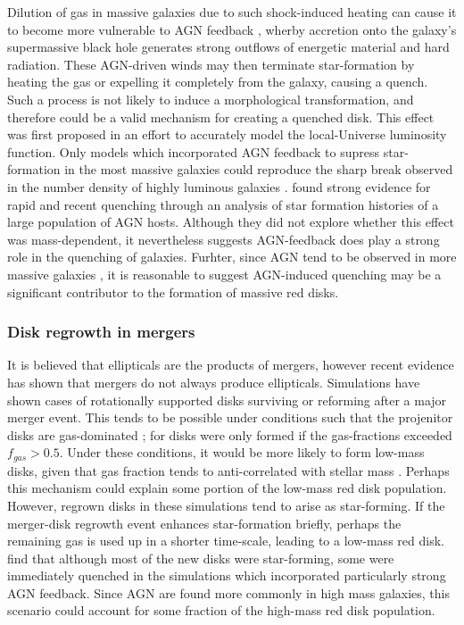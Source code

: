 \documentclass[useAMS,usenatbib]{mn2e}
\begin{document}
Dilution of gas in massive galaxies due to such shock-induced heating can cause it to become more vulnerable to AGN feedback \citep{Dekel2006}, wherby accretion onto the galaxy's supermassive black hole generates strong outflows of energetic material and hard radiation. These AGN-driven winds may then terminate star-formation by heating the gas or expelling it completely from the galaxy, causing a quench. Such a process is not likely to induce a morphological transformation, and therefore could be a valid mechanism for creating a quenched disk. This effect was first proposed in an effort to accurately model the local-Universe luminosity function. Only models which incorporated AGN feedback to supress star-formation in the most massive galaxies could reproduce the sharp break observed in the number density of highly luminous galaxies \citep{Benson2003,DiMatteo2005,Bower2006,Croton2006,Somerville2008}. \citet{Smethurst2016} found strong evidence for rapid and recent quenching through an analysis of star formation histories of a large population of AGN hosts. Although they did not explore whether this effect was mass-dependent, it nevertheless suggests AGN-feedback does play a strong role in the quenching of galaxies. Furhter, since AGN tend to be observed in more massive galaxies \citep{Schawinski2007,Lee2012,Oh2012,Alonso2013,Galloway2015}, it is reasonable to suggest AGN-induced quenching may be a significant contributor to the formation of massive red disks. 

\subsubsection{Disk regrowth in mergers}

It is believed that ellipticals are the products of mergers, however recent evidence has shown that mergers do not always produce ellipticals. Simulations have shown cases of rotationally supported disks surviving or reforming after a major merger event. This tends to be possible under conditions such that the projenitor disks are gas-dominated \citep{Governato2009,Springel2005a}; for \citet{Robertson2006} disks were only formed if the gas-fractions exceeded $f_{gas}>0.5$. Under these conditions, it would be more likely to form low-mass disks, given that gas fraction tends to anti-correlated with stellar mass \citep{Kannappan2004,Bell2000}. Perhaps this mechanism could explain some portion of the low-mass red disk population. However, regrown disks in these simulations tend to arise as star-forming. If the merger-disk regrowth event enhances star-formation briefly, perhaps the remaining gas is used up in a shorter time-scale, leading to a low-mass red disk. \citet{Sparre2017} find that although most of the new disks were star-forming, some were immediately quenched in the simulations which incorporated particularly strong AGN feedback. Since AGN are found more commonly in high mass galaxies, this scenario could account for some fraction of the high-mass red disk population.
\end{document}
